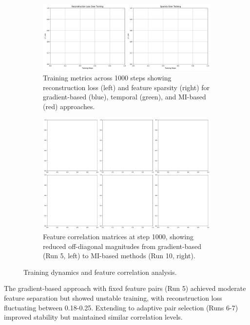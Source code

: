 \documentclass{article} %
\begin{document}
\begin{figure}[h]
    \centering
    \begin{subfigure}{0.49\textwidth}
        \includegraphics[width=\textwidth]{training_metrics.png}
        \caption{Training metrics across 1000 steps showing reconstruction loss (left) and feature sparsity (right) for gradient-based (blue), temporal (green), and MI-based (red) approaches.}
        \label{fig:metrics}
    \end{subfigure}
    \hfill
    \begin{subfigure}{0.49\textwidth}
        \includegraphics[width=\textwidth]{feature_correlations.png}
        \caption{Feature correlation matrices at step 1000, showing reduced off-diagonal magnitudes from gradient-based (Run 5, left) to MI-based methods (Run 10, right).}
        \label{fig:correlations}
    \end{subfigure}
    \caption{Training dynamics and feature correlation analysis.}
    \label{fig:results_overview}
\end{figure}

The gradient-based approach with fixed feature pairs (Run 5) achieved moderate feature separation but showed unstable training, with reconstruction loss fluctuating between 0.18-0.25. Extending to adaptive pair selection (Runs 6-7) improved stability but maintained similar correlation levels.
\end{document}
